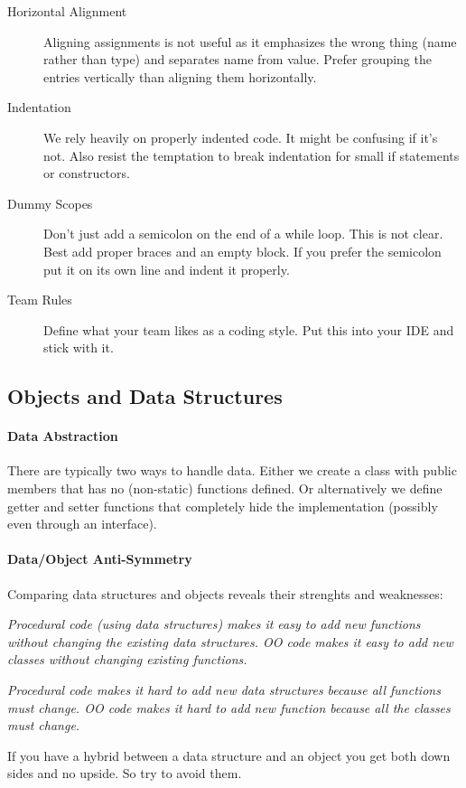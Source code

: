 \documentclass[a4paper, twocolumn]{article}
\begin{document}
\begin{description}
	\item[Horizontal Alignment] Aligning assignments is not useful as it emphasizes the wrong thing (name rather than type) and separates name from value. Prefer grouping the entries vertically than aligning them horizontally.
	\item[Indentation] We rely heavily on properly indented code. It might be confusing if it's not. Also resist the temptation to break indentation for small if statements or constructors.
	\item[Dummy Scopes] Don't just add a semicolon on the end of a while loop. This is not clear. Best add proper braces and an empty block. If you prefer the semicolon put it on its own line and indent it properly.
	\item[Team Rules] Define what your team likes as a coding style. Put this into your IDE and stick with it.
\end{description}

\subsection{Objects and Data Structures}
\paragraph{Data Abstraction}
There are typically two ways to handle data. Either we create a class with public members that has no (non-static) functions defined. Or alternatively we define getter and setter functions that completely hide the implementation (possibly even through an interface).

\paragraph{Data/Object Anti-Symmetry} Comparing data structures and objects reveals their strenghts and weaknesses:

\textit{Procedural code (using data structures) makes it easy to add new functions without changing the existing data structures. OO code makes it easy to add new classes without changing existing functions.}

\textit{Procedural code makes it hard to add new data structures because all functions must change. OO code makes it hard to add new function because all the classes must change.}

If you have a hybrid between a data structure and an object you get both down sides and no upside. So try to avoid them.
\end{document}

